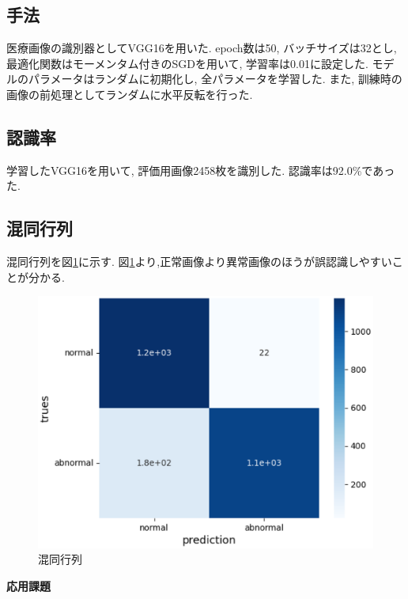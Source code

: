 	\subsection{手法}
		医療画像の識別器としてVGG16を用いた. epoch数は50, バッチサイズは32とし,
		最適化関数はモーメンタム付きのSGDを用いて, 学習率は0.01に設定した.
		モデルのパラメータはランダムに初期化し, 全パラメータを学習した.
		また, 訓練時の画像の前処理としてランダムに水平反転を行った.


	\subsection{認識率}
		学習したVGG16を用いて, 評価用画像2458枚を識別した.
		認識率は92.0\%であった.

	\subsection{混同行列}
		混同行列を図\ref{Confusion_Matrix}に示す.
		図\ref{Confusion_Matrix}より,正常画像より異常画像のほうが誤認識しやすいことが分かる.

	\begin{figure}[htbp]
		\begin{center}
			\includegraphics[width=12cm]{confusion_matrix.eps}
			\caption{混同行列}
			\label{Confusion_Matrix}
		\end{center}
	\end{figure}

	\newpage
	\begin{center}
		{\LARGE \bf 応用課題}
	\end{center}

